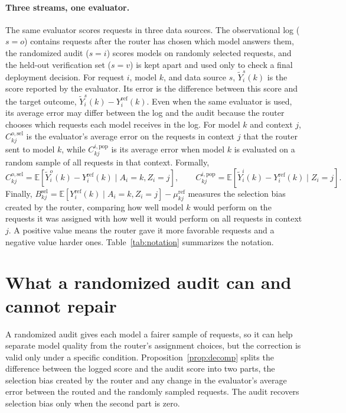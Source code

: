\documentclass{article}
\theoremstyle{plain}
\theoremstyle{remark}
\newcommand{\Yref}{Y^{\mathrm{ref}}}
\newcommand{\muref}{\mu^{\mathrm{ref}}}
\newcommand{\Bsel}{B^{\mathrm{sel}}}
\begin{document}
\paragraph{Three streams, one evaluator.} The same evaluator scores requests in three data sources.
The observational log ($s=o$) contains requests after the router has chosen which model answers them,
the randomized audit ($s=i$) scores models on randomly selected requests, and the held-out
verification set ($s=v$) is kept apart and used only to check a final deployment decision. For
request $i$, model $k$, and data source $s$, $\widetilde Y^s_i(k)$ is the
score reported by the evaluator. Its error is the difference between this score and the target
outcome, $\widetilde Y^s_i(k)-\Yref_i(k)$. Even when the same evaluator is used, its average error may
differ between the log and the audit because the router chooses which requests each model receives in
the log. For model $k$ and context $j$, $C^{o,\mathrm{sel}}_{kj}$ is the evaluator's average error on
the requests in context $j$ that the router sent to model $k$, while $C^{i,\mathrm{pop}}_{kj}$ is its
average error when model $k$ is evaluated on a random sample of all requests in that context.
Formally,
\[
C^{o,\mathrm{sel}}_{kj}=\mathbb E\!\left[\widetilde Y^o_i(k)-\Yref_i(k)\mid A_i{=}k,Z_i{=}j\right],
\qquad
C^{i,\mathrm{pop}}_{kj}=\mathbb E\!\left[\widetilde Y^i_i(k)-\Yref_i(k)\mid Z_i{=}j\right].
\]
Finally, $\Bsel_{kj}=\mathbb E[\Yref_i(k)\mid A_i{=}k,Z_i{=}j]-\muref_{kj}$ measures the selection
bias created by the router, comparing how well model $k$ would perform on the requests it was
assigned with how well it would perform on all requests in context $j$. A positive value means the
router gave it more favorable requests and a negative value harder ones.
Table~\ref{tab:notation} summarizes the notation.

\section{What a randomized audit can and cannot repair}\label{sec:model}
A randomized audit gives each model a fairer sample of requests, so it can help separate model
quality from the router's assignment choices, but the correction is valid only under a specific
condition. Proposition~\ref{prop:decomp} splits the difference between the logged score and the audit
score into two parts, the selection bias created by the router and any change in the evaluator's
average error between the routed and the randomly sampled requests. The audit recovers selection
bias only when the second part is zero.
\end{document}
